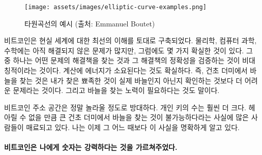 \begin{figure}
	\texttt{[image: assets/images/elliptic-curve-examples.png]}
	\caption{타원곡선의 예시 (출처: Emmanuel Boutet)}
	\label{fig:elliptic-curve-examples}
\end{figure}

\begin{comment}
	Bitcoin is built upon our best understanding of reality. While there are
	still many open problems in physics, computer science, and mathematics,
	we are pretty sure about some things. That there is an asymmetry between
	finding solutions and validating the correctness of these solutions is
	one such thing. That computation needs energy is another one. In other
	words: finding a needle in a haystack is harder than checking if the
	pointy thing in your hand is indeed a needle or not. And finding the
	needle takes work.
\end{comment}
비트코인은 현실 세계에 대한 최선의 이해를 토대로 구축되었다.
물리학, 컴퓨터 과학, 수학에는 아직 해결되지 않은 문제가 많지만, 그럼에도 몇 가지 확실한 것이 있다.
그 중 하나는 어떤 문제의 해결책을 찾는 것과 그 해결책의 정확성을 검증하는 것이 비대칭적이라는 것이다.
계산에 에너지가 소요된다는 것도 확실하다.
즉, 건초 더미에서 바늘을 찾는 것은 내가 찾은 뾰족한 것이 실제 바늘인지 아닌지 확인하는 것보다 더 어려운 문제라는 것이다. 
그리고 바늘을 찾는 노력이 필요하다는 것도 말이다.

\begin{comment}
	The vastness of Bitcoin's address space is truly mind-boggling. The
	number of private keys even more so. It is fascinating how much of our
	modern world boils down to the improbability of finding a needle in an
	unfathomably large haystack. I am now more aware of this fact than ever.
\end{comment}
비트코인 주소 공간은 정말 놀라울 정도로 방대하다. 개인 키의 수는 훨씬 더 크다.
헤아릴 수 없을 만큼 큰 건초 더미에서 바늘을 찾는 것이 불가능하다라는 사실에 많은 사람들이 매료되고 있다.
나는 이제 그 어느 때보다 이 사실을 명확하게 알고 있다.

\paragraph{비트코인은 나에게 숫자는 강력하다는 것을 가르쳐주었다.}


